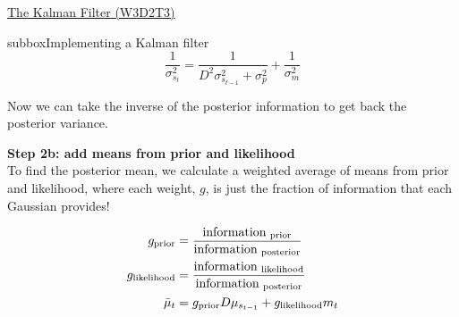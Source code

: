 \begin{textbox}{\href{http://instructor.compneuro.neuromatch.io/tutorials/W3D2_HiddenDynamics/instructor/W3D2_Tutorial3.html}{The Kalman Filter (W3D2T3)}   }
\begin{subbox}{subbox}{Implementing a Kalman filter}
\begin{equation}
\frac{1}{\sigma_{s_t}^2} = \frac{1}{D^2\sigma_{s_{t-1}}^2 +\sigma_p^2} + \frac{1}{\sigma_m^2}
\end{equation}

Now we can take the inverse of the posterior information to get back the posterior variance.

\textbf{Step 2b: add means from prior and likelihood}\\ 

To find the posterior mean, we calculate a weighted average of means from prior and likelihood, where each weight, $g$, is just the fraction of information that each Gaussian provides!

\begin{align}
g_{\rm{prior}} &= \frac{\rm{information}_{\textit{ }\rm{prior}}}{\rm{information}_{\textit{ }\rm{posterior}}} \\
g_{\rm{likelihood}} &= \frac{\rm{information}_{\textit{ }\rm{likelihood}}}{\rm{information}_{\textit{ }\rm{posterior}}} \\
\bar{\mu}_t &= g_{\rm{prior}} D\mu_{s_{t-1}} + g_{\rm{likelihood}} m_t
\end{align}
\end{subbox}

\end{textbox}
